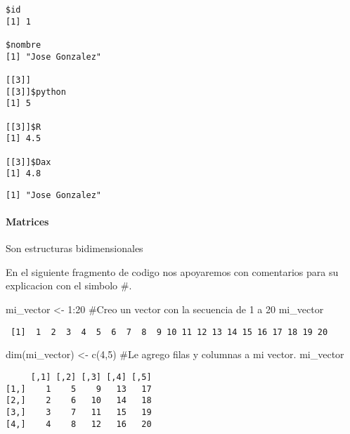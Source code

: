 \documentclass[
  letterpaper,
  DIV=11,
  numbers=noendperiod]{scrartcl}
\let\oldparagraph\paragraph
\renewcommand{\paragraph}[1]{\oldparagraph{#1}\mbox{}}
\newenvironment{Shaded}{\begin{snugshade}}{\end{snugshade}}
\newcommand{\CommentTok}[1]{\textcolor[rgb]{0.37,0.37,0.37}{#1}}
\newcommand{\DecValTok}[1]{\textcolor[rgb]{0.68,0.00,0.00}{#1}}
\newcommand{\FunctionTok}[1]{\textcolor[rgb]{0.28,0.35,0.67}{#1}}
\newcommand{\NormalTok}[1]{\textcolor[rgb]{0.00,0.23,0.31}{#1}}
\newcommand{\OtherTok}[1]{\textcolor[rgb]{0.00,0.23,0.31}{#1}}
\newcommand{\SpecialCharTok}[1]{\textcolor[rgb]{0.37,0.37,0.37}{#1}}
\begin{document}
\begin{verbatim}
$id
[1] 1

$nombre
[1] "Jose Gonzalez"

[[3]]
[[3]]$python
[1] 5

[[3]]$R
[1] 4.5

[[3]]$Dax
[1] 4.8
\end{verbatim}

\begin{Shaded}
\end{Shaded}

\begin{verbatim}
[1] "Jose Gonzalez"
\end{verbatim}

\paragraph{Matrices}\label{matrices}

Son estructuras bidimensionales

En el siguiente fragmento de codigo nos apoyaremos con comentarios para
su explicacion con el simbolo \#.

\begin{Shaded}
\begin{Highlighting}[]
\NormalTok{mi\_vector }\OtherTok{\textless{}{-}} \DecValTok{1}\SpecialCharTok{:}\DecValTok{20} \CommentTok{\#Creo un vector con la secuencia de 1 a 20}
\NormalTok{mi\_vector}
\end{Highlighting}
\end{Shaded}

\begin{verbatim}
 [1]  1  2  3  4  5  6  7  8  9 10 11 12 13 14 15 16 17 18 19 20
\end{verbatim}

\begin{Shaded}
\begin{Highlighting}[]
\FunctionTok{dim}\NormalTok{(mi\_vector) }\OtherTok{\textless{}{-}} \FunctionTok{c}\NormalTok{(}\DecValTok{4}\NormalTok{,}\DecValTok{5}\NormalTok{) }\CommentTok{\#Le agrego filas y columnas a mi vector.}
\NormalTok{mi\_vector}
\end{Highlighting}
\end{Shaded}

\begin{verbatim}
     [,1] [,2] [,3] [,4] [,5]
[1,]    1    5    9   13   17
[2,]    2    6   10   14   18
[3,]    3    7   11   15   19
[4,]    4    8   12   16   20
\end{verbatim}
\end{document}
